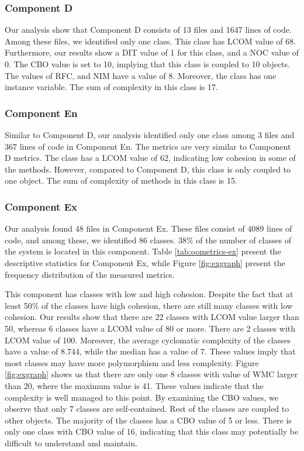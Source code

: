 \subsubsection{Component D}
Our analysis show that Component D consists of 13 files and 1647 lines of code. Among these files, we identified only one class. This class has LCOM value of 68. Furthermore, our results show a DIT value of 1 for this class, and a NOC value of 0. The CBO value is set to 10, implying that this class is coupled to 10 objects. The values of RFC, and NIM have a value of 8. Moreover, the class has one instance variable. The sum of complexity in this class is 17.

\subsubsection{Component En}
Similar to Component D, our analysis identified only one class among 3 files and 367 lines of code in Component En. The metrics are very similar to Component D metrics. The class has a LCOM value of 62, indicating low cohesion in some of the methods. However, compared to Component D, this class is only coupled to one object. The sum of complexity of methods in this class is 15.


\subsubsection{Component Ex}
Our analysis found 48 files in Component Ex. These files consist of 4089 lines of code, and among these, we identified 86 classes. 38\% of the number of classes of the system is located in this component. Table \ref{tab:oometrics-ex} present the descriptive statistics for Component Ex, while Figure \ref{fig:exgraph} present the frequency distribution of the measured metrics. 

This component has classes with low and high cohesion. Despite the fact that at least 50\% of the classes have high cohesion, there are still many classes with low cohesion. Our results show that there are 22 classes with LCOM value larger than 50, whereas 6 classes have a LCOM value of 80 or more. There are 2 classes with LCOM value of 100. Moreover, the average cyclomatic complexity of the classes have a value of 8.744, while the median has a value of 7. These values imply that most classes may have more polymorphism and less complexity. Figure \ref{fig:exgraph} shows us that there are only one 8 classes with value of WMC larger than 20, where the maximum value is 41. These values indicate that the complexity is well managed to this point. By examining the CBO values, we observe that only 7 classes are self-contained. Rest of the classes are coupled to other objects. The majority of the classes has a CBO value of 5 or less. There is only one class with CBO value of 16, indicating that this class may potentially be difficult to understand and maintain. 

